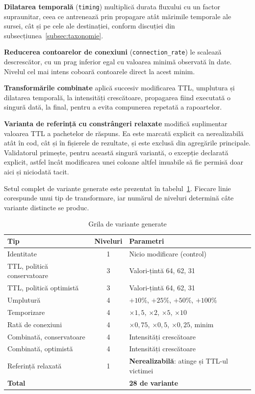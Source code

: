 \textbf{Dilatarea temporală} (\verb|timing|) multiplică durata fluxului cu un factor supraunitar, ceea ce antrenează prin propagare atât mărimile temporale ale sursei, cât și pe cele ale destinației, conform discuției din subsecțiunea~\ref{subsec:taxonomie}.

\textbf{Reducerea contoarelor de conexiuni} (\verb|connection_rate|) le scalează descrescător, cu un prag inferior egal cu valoarea minimă observată în date. Nivelul cel mai intens coboară contoarele direct la acest minim.

\textbf{Transformările combinate} aplică succesiv modificarea TTL, umplutura și dilatarea temporală, la intensități crescătoare, propagarea fiind executată o singură dată, la final, pentru a evita compunerea repetată a rapoartelor.

\textbf{Varianta de referință cu constrângeri relaxate} modifică suplimentar valoarea TTL a pachetelor de răspuns. Ea este marcată explicit ca nerealizabilă atât în cod, cât și în fișierele de rezultate, și este exclusă din agregările principale. Validatorul primește, pentru această singură variantă, o excepție declarată explicit, astfel încât modificarea unei coloane altfel imuabile să fie permisă doar aici și niciodată tacit.

Setul complet de variante generate este prezentat în tabelul~\ref{tab:grila}. Fiecare linie corespunde unui tip de transformare, iar numărul de niveluri determină câte variante distincte se produc.

\begin{table}[!ht]
    \caption{Grila de variante generate}
    \centering
    \begin{tabular}{|l|c|p{5.4cm}|}
        \hline
        \textbf{Tip} & \textbf{Niveluri} & \textbf{Parametri} \\
        \hline
        Identitate & 1 & Nicio modificare (control) \\
        \hline
        TTL, politică conservatoare & 3 & Valori-țintă 64, 62, 31 \\
        \hline
        TTL, politică optimistă & 3 & Valori-țintă 64, 62, 31 \\
        \hline
        Umplutură & 4 & $+10\%$, $+25\%$, $+50\%$, $+100\%$ \\
        \hline
        Temporizare & 4 & $\times 1{,}5$, $\times 2$, $\times 5$, $\times 10$ \\
        \hline
        Rată de conexiuni & 4 & $\times 0{,}75$, $\times 0{,}5$, $\times 0{,}25$, minim \\
        \hline
        Combinată, conservatoare & 4 & Intensități crescătoare \\
        \hline
        Combinată, optimistă & 4 & Intensități crescătoare \\
        \hline
        Referință relaxată & 1 & \textbf{Nerealizabilă}: atinge și TTL-ul victimei \\
        \hline
        \multicolumn{2}{|l|}{\textbf{Total}} & \textbf{28 de variante} \\
        \hline
    \end{tabular}
    \label{tab:grila}
\end{table}

